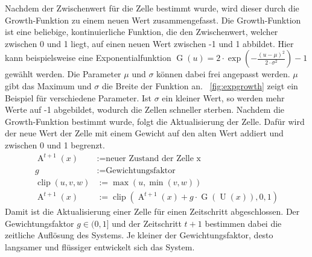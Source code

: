 Nachdem der Zwischenwert für die Zelle bestimmt wurde, wird dieser durch die Growth-Funktion zu einem neuen Wert zusammengefasst.
Die Growth-Funktion ist eine beliebige, kontinuierliche Funktion, die den Zwischenwert, welcher zwischen 0 und 1 liegt, auf einen neuen Wert zwischen -1 und 1 abbildet.
Hier kann beispielsweise eine Exponentialfunktion $\operatorname{G}(u) = 2 \cdot \exp \left(-\frac{(u - \mu)^2}{2 \cdot \sigma^2}\right) - 1$ gewählt werden.
Die Parameter $\mu$ und $\sigma$ können dabei frei angepasst werden.
$\mu$ gibt das Maximum und $\sigma$ die Breite der Funktion an.
~\autoref{fig:expgrowth} zeigt ein Beispiel für verschiedene Parameter.
Ist $\sigma$ ein kleiner Wert, so werden mehr Werte auf -1 abgebildet, wodurch die Zellen schneller sterben.
Nachdem die Growth-Funktion bestimmt wurde, folgt die Aktualisierung der Zelle.
Dafür wird der neue Wert der Zelle mit einem Gewicht auf den alten Wert addiert und zwischen 0 und 1 begrenzt.
\[
    \begin{aligned}
        \operatorname{A}^{t+1}(x)  & := \text{neuer Zustand der Zelle x}                                                                                           \\
        g                          & := \text{Gewichtungsfaktor}                                                                                                   \\
        \operatorname{clip}(u,v,w) & := \operatorname{max}(u, \operatorname{min}(v, w))                                                                            \\
        \operatorname{A}^{t+1}(x)  & := \operatorname{clip}\left(\operatorname{A}^{t+1}(x) + g \cdot \operatorname{G}\left(\operatorname{U}(x)\right), 0, 1\right)
    \end{aligned}
\]
Damit ist die Aktualisierung einer Zelle für einen Zeitschritt abgeschlossen.
Der Gewichtungsfaktor $g \in (0,1]$ und der Zeitschritt $t+1$ bestimmen dabei die zeitliche Auflösung des Systems.
Je kleiner der Gewichtungsfaktor, desto langsamer und flüssiger entwickelt sich das System.



